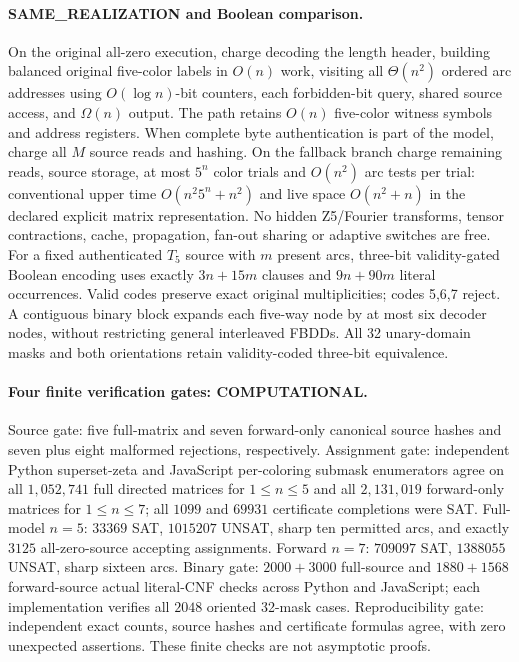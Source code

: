 \documentclass[11pt]{article}
\begin{document}
\paragraph{SAME\_REALIZATION and Boolean comparison.}
On the original all-zero execution, charge decoding the length header,
building balanced original five-color labels in $O(n)$ work, visiting
all $\Theta(n^2)$ ordered arc addresses using $O(\log n)$-bit counters,
each forbidden-bit query, shared source access, and $\Omega(n)$ output.
The path retains $O(n)$ five-color witness symbols and address
registers. When complete byte authentication is part of the model,
charge all $M$ source reads and hashing. On the fallback branch charge
remaining reads, source storage, at most $5^n$ color trials and
$O(n^2)$ arc tests per trial: conventional upper time
$O(n^2 5^n+n^2)$ and live space $O(n^2+n)$ in the declared explicit
matrix representation. No hidden Z5/Fourier transforms, tensor
contractions, cache, propagation, fan-out sharing or adaptive
switches are free. For a fixed authenticated $T_5$ source with $m$
present arcs, three-bit validity-gated Boolean encoding uses exactly
$3n+15m$ clauses and $9n+90m$ literal occurrences. Valid codes
preserve exact original multiplicities; codes 5,6,7 reject. A
contiguous binary block expands each five-way node by at most six
decoder nodes, without restricting general interleaved FBDDs.
All 32 unary-domain masks and both orientations retain validity-coded
three-bit equivalence.
\paragraph{Four finite verification gates: COMPUTATIONAL.}
Source gate: five full-matrix and seven forward-only canonical source
hashes and seven plus eight malformed rejections, respectively.
Assignment gate: independent Python superset-zeta and JavaScript
per-coloring submask enumerators agree on all $1{,}052{,}741$ full
directed matrices for $1\le n\le5$ and all $2{,}131{,}019$
forward-only matrices for $1\le n\le7$; all $1099$ and $69931$
certificate completions were SAT. Full-model $n=5$: $33369$ SAT,
$1015207$ UNSAT, sharp ten permitted arcs, and exactly $3125$
all-zero-source accepting assignments. Forward $n=7$: $709097$
SAT, $1388055$ UNSAT, sharp sixteen arcs. Binary gate:
$2000+3000$ full-source and $1880+1568$ forward-source
actual literal-CNF checks across Python and JavaScript; each
implementation verifies all $2048$ oriented 32-mask cases.
Reproducibility gate: independent exact counts, source hashes and
certificate formulas agree, with zero unexpected assertions. These
finite checks are not asymptotic proofs.
\end{document}
